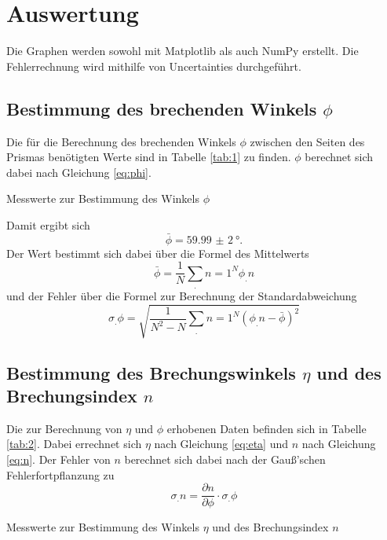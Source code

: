 \section{Auswertung}
\label{sec:Auswertung}


Die Graphen werden sowohl mit Matplotlib \cite{matplotlib} als auch NumPy \cite{numpy} erstellt. Die Fehlerrechnung wird mithilfe von Uncertainties \cite{uncertainties} durchgeführt.
\subsection{Bestimmung des brechenden Winkels $\phi$}

Die für die Berechnung des brechenden Winkels $\phi$ zwischen den Seiten des Prismas benötigten Werte sind in Tabelle \ref{tab:1} zu finden.
$\phi$ berechnet sich dabei nach Gleichung \eqref{eq:phi}.
\begin{table}
	\centering
	\caption{Messwerte zur Bestimmung des Winkels $\phi$}
	
	\label{tab:1}
\end{table}
\noindent
Damit ergibt sich
\[
\bar{\phi} = \SI{59,99(2)}{\degree}\text{.}
\]
Der Wert bestimmt sich dabei über die Formel des Mittelwerts
\[
\bar{\phi} = \frac{1}{N}\sum_.{n=1}^N \phi_.n
\]
und der Fehler über die Formel zur Berechnung der Standardabweichung
\[
\sigma_.{\phi}=\sqrt{\frac{1}{N^2-N}\sum_.{n=1}^N \left(\phi_.n-\bar{\phi}\right)^2}
\]
\subsection{Bestimmung des Brechungswinkels $\eta$ und des Brechungsindex $n$}
Die zur Berechnung von $\eta$ und $\phi$ erhobenen Daten befinden sich in Tabelle \ref{tab:2}.
Dabei errechnet sich $\eta$ nach Gleichung \eqref{eq:eta} und $n$ nach Gleichung \eqref{eq:n}.
Der Fehler von $n$ berechnet sich dabei nach der Gauß'schen Fehlerfortpflanzung zu
\[
\sigma_.n=\frac{\partial n}{\partial \phi}\cdot \sigma_.{\phi}
\]
\begin{table}
	\centering
	\caption{Messwerte zur Bestimmung des Winkels $\eta$ und des Brechungsindex $n$}
	
	\label{tab:2}
\end{table}

